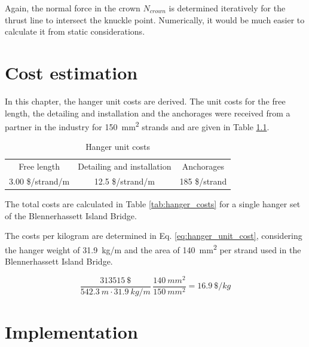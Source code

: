 Again, the normal force in the crown $N_{crown}$ is determined iteratively for the thrust line to intersect the knuckle point. Numerically, it would be much easier to calculate it from static considerations.

\chapter{Cost estimation}
In this chapter, the hanger unit costs are derived. The unit costs for the free length, the detailing and installation and the anchorages were received from a partner in the industry for \SI{150}{mm^2} strands and are given in Table \ref{tab:hanger_unit}.

\begin{table}[H]
\centering
\begin{tabular}{ccc}
\hline
Free length      & Detailing and installation & Anchorages    \\
3.00 \$/strand/m & 12.5 \$/strand/m           & 185 \$/strand \\ \hline
\end{tabular}
\caption{Hanger unit costs}
\label{tab:hanger_unit}
\end{table}

The total costs are calculated in Table \ref{tab:hanger_costs} for a single hanger set of the Blennerhassett Island Bridge. 



The costs per kilogram are determined in Eq. \ref{eq:hanger_unit_cost}, considering the hanger weight of \SI{31.9}{kg/m} and the area of \SI{140}{mm^2} per strand used in the Blennerhassett Island Bridge.

\begin{equation}
    \frac{\SI{313515}{\$}}{\SI{542.3}{m} \cdot \SI{31.9}{kg/m}} \, \frac{\SI{140}{mm^2}}{\SI{150}{mm^2}}= \SI{16.9}{\$/kg}
    \label{eq:hanger_unit_cost}
\end{equation}

\newpage
\chapter{Implementation}

